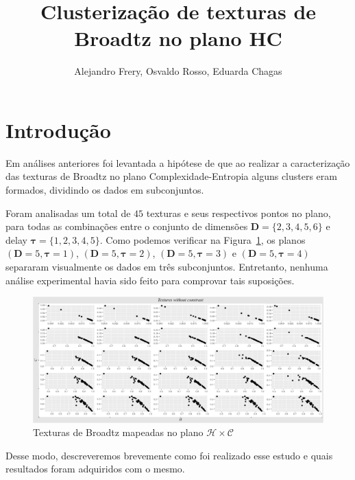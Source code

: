 \documentclass[12pt]{article}
\title{Clusterização de texturas de Broadtz no plano HC}
\author{Alejandro Frery\inst{1}, Osvaldo Rosso\inst{1}, Eduarda Chagas\inst{2}}
\begin{document}
\maketitle

\section{Introdução}

Em análises anteriores foi levantada a hipótese de que ao realizar a caracterização das texturas de Broadtz no plano Complexidade-Entropia alguns clusters eram formados, dividindo os dados em subconjuntos.

Foram analisadas um total de $45$ texturas e seus respectivos pontos no plano, para todas as combinações entre o conjunto de dimensões $\bm D = \{2,3,4,5,6\}$ e delay $\bm \tau = \{1,2,3,4,5\}$. Como podemos verificar na Figura~\ref{fig:textureshC}, os planos $(\bm D = 5, \bm \tau = 1)$, $(\bm D = 5, \bm \tau = 2)$, $(\bm D = 5, \bm \tau = 3)$ e $(\bm D = 5, \bm \tau = 4)$ separaram visualmente os dados em três subconjuntos. Entretanto, nenhuma análise experimental havia sido feito para comprovar tais suposições. 

\begin{figure}[!h]
	\centering
	\includegraphics[scale = 0.42]{../../Images/Textures/Textures_no_contrast.png}   
	\caption{Texturas de Broadtz mapeadas no plano $\mathcal H\times \mathcal C$}
	\label{fig:textureshC}
\end{figure}

Desse modo, descreveremos brevemente como foi realizado esse estudo e quais resultados foram adquiridos com o mesmo.
\end{document}
